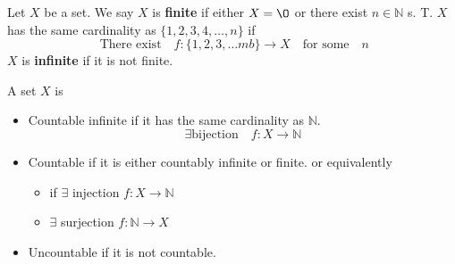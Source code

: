 \documentclass{article}
\theoremstyle{remark}
\begin{document}
\begin{definition}
  Let $X$ be a set. We say $X$ is \textbf{finite} if either $X = \O $ or there exist $n \in \mathbb{N} $ s. T. $X$ has the same cardinality as $\{ 1,2,3,4, \ldots, n\} $ if \[
 \text{ There exist} \quad  f: \{1,2,3, \ldots m b\}  \to X \quad \text{for some} \quad  n    
  \] 
  $X$ is \textbf{infinite }  if it is not finite.
\end{definition}

\begin{definition}
  A set $X$ is 
  \begin{itemize}
    \item Countable infinite if it has the same cardinality as $\mathbb{N} $. \[
    \exists \text{bijection} \quad  f: X \to \mathbb{N}  
    \] 
  \item Countable if it is either countably infinite or finite. or equivalently 
    \begin{itemize}
      \item if $\exists$ injection $f: X \to \mathbb{N} $ 
      \item $\exists$ surjection $f: \mathbb{N}  \to X$
    \end{itemize}
  \item Uncountable if it is not countable.
  \end{itemize}
\end{definition}




\end{document}
